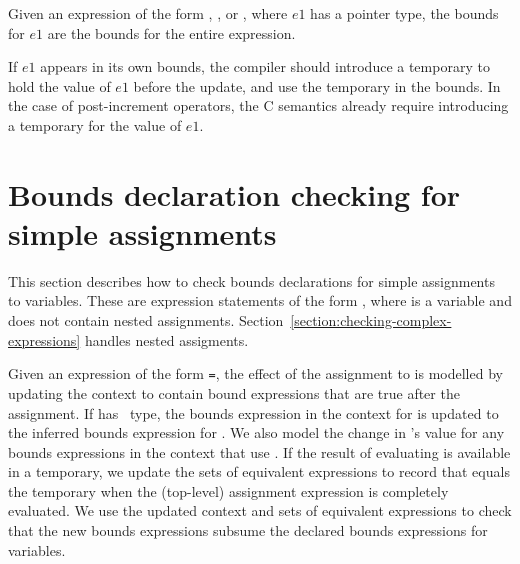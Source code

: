 Given an expression of the form \code{++}, \code{--},
 \code{++} or \code{--}, where $e1$ has a pointer type,
 the bounds for $e1$ are the bounds for the entire expression.
 
 If $e1$ appears in its own bounds, the compiler should introduce a
 temporary to hold the value of $e1$ before the update, and use
 the temporary in the bounds.  In the case of post-increment operators, 
 the C semantics already require  introducing a temporary for the value of $e1$.

\section{Bounds declaration checking for simple assignments}
\label{section:checking-simple-assignment}

This section describes how to check bounds declarations for
simple assignments to variables.  These are expression statements of the
form , where  is a variable and  does
not contain nested assignments.
Section~\ref{section:checking-complex-expressions} handles nested assigments.

Given an expression of the form \lstinline+=+, the effect of the assignment
to  is modelled by updating the context to contain bound expressions that are true
after the assignment.  If  has \arrayptr\ type, the bounds expression in
the context for  is updated to the inferred bounds expression for .
We also model the change in 's
value for any bounds expressions in the context that use .   If the result of 
evaluating  is available in a temporary, we update the sets of equivalent
expressions to record that  equals the temporary when the (top-level) assignment
expression is completely evaluated.
We use the updated context and sets of equivalent expressions to check
that the new bounds expressions subsume the declared bounds expressions for variables.

